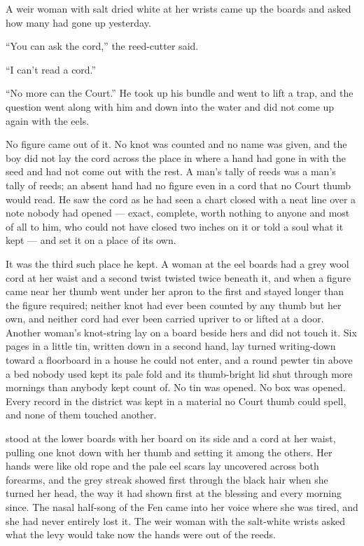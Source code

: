 A weir woman with salt dried white at her wrists came up the boards and asked how many had gone up yesterday.

“You can ask the cord,” the reed-cutter said.

“I can't read a cord.”

“No more can the Court.” He took up his bundle and went to lift a trap, and the question went along with him and down into the water and did not come up again with the eels.

No figure came out of it. No knot was counted and no name was given, and the boy did not lay the cord across the place in  where a hand had gone in with the seed and had not come out with the rest. A man's tally of reeds was a man's tally of reeds; an absent hand had no figure even in a cord that no Court thumb would read. He saw the cord as he had seen a chart closed with a neat line over a note nobody had opened --- exact, complete, worth nothing to anyone and most of all to him, who could not have closed two inches on it or told a soul what it kept --- and set it on a place of its own.

It was the third such place he kept. A woman at the eel boards had a grey wool cord at her waist and a second twist twisted twice beneath it, and when a figure came near her thumb went under her apron to the first and stayed longer than the figure required; neither knot had ever been counted by any thumb but her own, and neither cord had ever been carried upriver to  or lifted at a door. Another woman's knot-string lay on a board beside hers and did not touch it. Six pages in a little tin, written down in a second hand, lay turned writing-down toward a floorboard in a house he could not enter, and a round pewter tin above a bed nobody used kept its pale fold and its thumb-bright lid shut through more mornings than anybody kept count of. No tin was opened. No box was opened. Every record in the district was kept in a material no Court thumb could spell, and none of them touched another.

\scenebreak

 stood at the lower boards with her board on its side and a cord at her waist, pulling one knot down with her thumb and setting it among the others. Her hands were like old rope and the pale eel scars lay uncovered across both forearms, and the grey streak showed first through the black hair when she turned her head, the way it had shown first at the blessing and every morning since. The nasal half-song of the Fen came into her voice where she was tired, and she had never entirely lost it. The weir woman with the salt-white wrists asked what the levy would take now the hands were out of the reeds.

